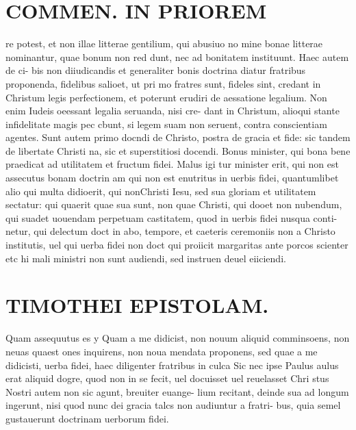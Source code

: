 \documentclass{article}
\begin{document}
\begin{pages}
\section*{COMMEN. IN PRIOREM }
\marginpar{[ p.102 ]}\pstart re potest, et non illae litterae gentilium, qui abusiuo no mine bonae litterae nominantur, quae bonum non red dunt, nec ad bonitatem instituunt. Haec autem de ci- bis non diiudicandis et generaliter bonis doctrina diatur fratribus proponenda, fidelibus salioet, ut pri mo fratres sunt, fideles sint, credant in Christum legis perfectionem, et poterunt erudiri de aessatione legalium. Non enim Iudeis oeessant legalia seruanda, nisi cre- dant in Christum, alioqui stante infidelitate magis pec cbunt, si legem suam non seruent, contra conscientiam agentes. Sunt autem primo docndi de Christo, postra de gracia et fide: sic tandem de libertate Christi na, sic et superstitiosi docendi. Bonus minister, qui bona bene praedicat ad utilitatem et fructum fidei. Malus igi tur minister erit, qui non est assecutus bonam doctrin am qui non est enutritus in uerbis fidei, quantumlibet alio qui multa didioerit, qui nonChristi Iesu, sed sua gloriam et utilitatem sectatur: qui quaerit quae sua sunt, non quae Christi, qui dooet non nubendum, qui suadet uouendam perpetuam castitatem, quod in uerbis fidei nusqua conti- netur, qui delectum doct in abo, tempore, et caeteris ceremoniis non a Christo institutis, uel qui uerba fidei non doct qui proiicit margaritas ante porcos scienter etc hi mali ministri non sunt audiendi, sed instruen deuel eiiciendi.  \pend
\section*{TIMOTHEI EPISTOLAM. }
\marginpar{[ p.103 ]}\pstart Quam assequutus es y Quam a me didicist, non nouum aliquid comminsoens, non neuas quaest ones inquirens, non noua mendata proponens, sed quae a me didicisti, uerba fidei, haec diligenter fratribus in culca Sic nec ipse Paulus aulus erat aliquid dogre, quod non in se fecit, uel docuisset uel reuelasset Chri stus Nostri autem non sic agunt, breuiter euange- lium recitant, deinde sua ad longum ingerunt, nisi quod nunc dei gracia talcs non audiuntur a fratri- bus, quia semel gustauerunt doctrinam uerborum fidei.  \pend
{}
{}

\end{pages}
\end{document}
